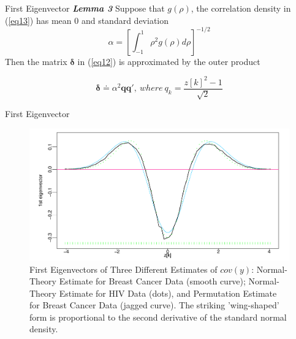 \documentclass{beamer}
\begin{document}
\begin{frame}[t]{First Eigenvector}\vspace{10pt}
\textbf{\textit{Lemma 3}} Suppose that $g(\rho)$, the correlation density in (\ref{eq13}) has mean 0 and standard deviation
\begin{equation}\label{eq16}
\alpha = \left[\int_{-1}^1\rho^2g(\rho)d\rho\right]^{-1/2}
\end{equation}
Then the matrix $\boldsymbol{\delta}$ in (\ref{eq12}) is approximated by the outer product

\begin{equation}\label{eq17}
\boldsymbol{\delta} \doteq \alpha^2\boldsymbol{q}\boldsymbol{q'}, \ where \ q_k = \frac{z[k]^2-1}{\sqrt{2}}
\end{equation}

\end{frame}


\begin{frame}[t]{First Eigenvector}\vspace{10pt}

\begin{figure}[h]
	\centering
	\includegraphics[scale=0.35]{efron2007figure3}
	\caption{\footnotesize{First Eigenvectors of Three Different Estimates of $cov(y)$: Normal-Theory Estimate for Breast Cancer Data (smooth curve); Normal-Theory Estimate for HIV Data (dots), and Permutation Estimate for Breast Cancer Data (jagged curve). The striking 'wing-shaped' form is proportional to the second derivative of the standard normal density.}}
	\label{fig3}
\end{figure}

\end{frame}
\end{document}
